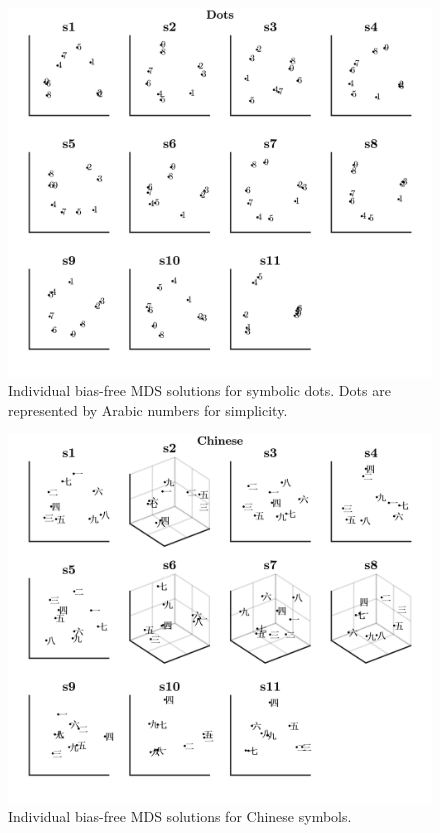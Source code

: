 \begin{figure}[tbh]
\centering \includegraphics[scale = .67]{Figures/Appendix/AppD/Indiv_MDS_2.jpg}
\caption{Individual bias-free MDS solutions for symbolic dots. Dots are represented by Arabic numbers for simplicity.}
\label{fig:Apx_MDSdots}
\end{figure}

\begin{figure}[tbh]
\centering \includegraphics[scale = .67]{Figures/Appendix/AppD/Indiv_MDS_3.jpg}
\caption{Individual bias-free MDS solutions for Chinese symbols.}
\label{fig:Apx_MDSchinese}
\end{figure}


